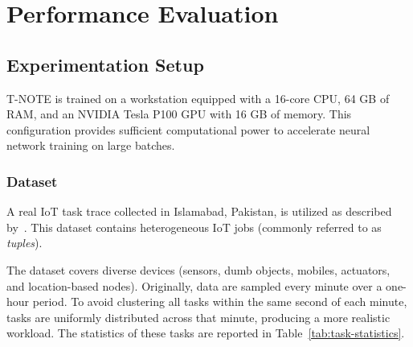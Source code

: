 \documentclass{svproc}
\begin{document}
\section{Performance Evaluation}\label{sec:performance_evaluation}

\subsection{Experimentation Setup}

T-NOTE is trained on a workstation equipped with a 16-core CPU, 64 GB of RAM, and an NVIDIA Tesla P100 GPU with 16 GB of memory. This configuration provides sufficient computational power to accelerate neural network training on large batches.


\subsubsection{Dataset}\label{subsec:dataset}

A real IoT task trace collected in Islamabad, Pakistan, is utilized as described by~\cite{aazam_cloud_2022}. This dataset contains heterogeneous IoT jobs (commonly referred to as \emph{tuples}).

The dataset covers diverse devices (sensors, dumb objects, mobiles, actuators, and location-based nodes). Originally, data are sampled every minute over a one-hour period. To avoid clustering all tasks within the same second of each minute, tasks are uniformly distributed across that minute, producing a more realistic workload. The statistics of these tasks are reported in Table~\ref{tab:task-statistics}.



\begin{table}[h!]
\centering

\caption{Statistical Summary of Generated Tasks}\label{tab:task-statistics}
\end{table}
\end{document}
